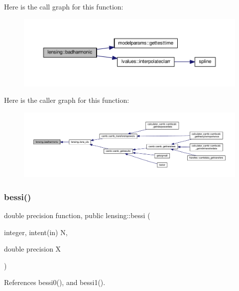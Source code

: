 Here is the call graph for this function\+:
\nopagebreak
\begin{figure}[H]
\begin{center}
\leavevmode
\includegraphics[width=350pt]{namespacelensing_a68242ee3fa839802f6aed94e9f8dcf73_cgraph}
\end{center}
\end{figure}
Here is the caller graph for this function\+:
\nopagebreak
\begin{figure}[H]
\begin{center}
\leavevmode
\includegraphics[width=350pt]{namespacelensing_a68242ee3fa839802f6aed94e9f8dcf73_icgraph}
\end{center}
\end{figure}
\mbox{\label{namespacelensing_a6849d58625a3e2cf0a2a22371141eb4a}} 
\subsubsection{\texorpdfstring{bessi()}{bessi()}}
{\footnotesize\ttfamily double precision function, public lensing\+::bessi (\begin{DoxyParamCaption}\item[{integer, intent(in)}]{N,  }\item[{double precision}]{X }\end{DoxyParamCaption})}



References bessi0(), and bessi1().

